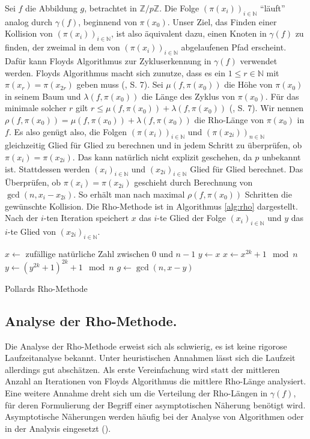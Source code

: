 \documentclass[a4paper, 11pt, ngerman]{article}
\newcommand{\N}{\mathbb{N}}
\newcommand{\Z}{\mathbb{Z}}
\theoremstyle{definition}
\theoremstyle{plain}
\theoremstyle{remark}
\begin{document}
Sei $f$ die Abbildung $g$, betrachtet in $\Z/p\Z$. Die Folge $(\pi(x_{i}))_{i \in \N}$ "`läuft"' analog durch $\gamma(f)$, beginnend von $\pi(x_0)$. Unser Ziel, das Finden einer Kollision von $(\pi(x_i))_{i \in \N}$, ist also äquivalent dazu, einen Knoten in $\gamma(f)$ zu finden, der zweimal in dem von $(\pi(x_i))_{i \in \N}$ abgelaufenen Pfad erscheint. Dafür kann Floyds Algorithmus zur Zykluserkennung in $\gamma(f)$ verwendet werden. Floyds Algorithmus macht sich zunutze, dass es ein $1 \le r \in \N$ mit $\pi(x_r) = \pi(x_{2r})$ geben muss (\cite{knu98}, S. 7). Sei $\mu(f, \pi(x_0))$ die Höhe von $\pi(x_0)$ in seinem Baum und $\lambda(f, \pi(x_0))$ die Länge des Zyklus von $\pi(x_0)$. Für das minimale solcher $r$ gilt $r \le \mu(f, \pi(x_0)) + \lambda(f, \pi(x_0))$ (\cite{knu98}, S. 7). Wir nennen $\rho(f, \pi(x_0)) = \mu(f, \pi(x_0)) + \lambda(f, \pi(x_0))$ die Rho-Länge von $\pi(x_0)$ in $f$. Es also genügt also, die Folgen $(\pi(x_i))_{i \in \N}$ und $(\pi(x_{2i}))_{n \in \N}$ gleichzeitig Glied für Glied zu berechnen und in jedem Schritt zu überprüfen, ob $\pi(x_i) = \pi(x_{2i})$. Das kann natürlich nicht explizit geschehen, da $p$ unbekannt ist. Stattdessen werden $(x_i)_{i \in \N}$ und $(x_{2i})_{i \in \N}$ Glied für Glied berechnet. Das Überprüfen, ob $\pi(x_i) = \pi(x_{2i})$ geschieht durch Berechnung von $\gcd(n, x_i - x_{2i})$. So erhält man nach maximal $\rho(f, \pi(x_0))$ Schritten die gewünschte Kollision. Die Rho-Methode ist in Algorithmus \ref{alg:rho} dargestellt. Nach der $i$-ten Iteration speichert $x$ das $i$-te Glied der Folge $(x_i)_{i \in \N}$ und $y$ das $i$-te Glied von $(x_{2i})_{i \in \N}$.
\begin{algorithm}
    $x \gets $ zufällige natürliche Zahl zwischen $0$ und $n - 1$ \;
    $y \gets x$ \;
    {
        $x \gets x^{2k} + 1 \mod n$ \;
        $y \gets (y^{2k} + 1)^{2k} + 1 \mod n$ \;
        $g \gets \gcd(n, x - y)$ \;
        {
             \;
        }
    }

    \caption{Pollards Rho-Methode}
    \label{alg:rho}
\end{algorithm}
\subsection{Analyse der Rho-Methode.}

Die Analyse der Rho-Methode erweist sich als schwierig, es ist keine rigorose Laufzeitanalyse bekannt. Unter heuristischen Annahmen lässt sich die Laufzeit allerdings gut abschätzen. Als erste Vereinfachung wird statt der mittleren Anzahl an Iterationen von Floyds Algorithmus die mittlere Rho-Länge analysiert. Eine weitere Annahme dreht sich um die Verteilung der Rho-Längen in $\gamma(f)$, für deren Formulierung der Begriff einer asymptotischen Näherung benötigt wird. Asymptotische Näherungen werden häufig bei der Analyse von Algorithmen oder in der Analysis eingesetzt (\cite{asym}).
\end{document}
